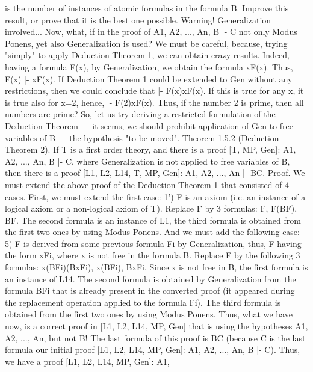is the number of instances of atomic formulas in the formula B. Improve this result, or prove that it is the
best one possible.
Warning! Generalization involved...
Now, what, if in the proof of A1, A2, ..., An, B |- C not only Modus Ponens, yet also Generalization is
used?
We must be careful, because, trying "simply" to apply Deduction Theorem 1, we can obtain crazy results.
Indeed, having a formula F(x), by Generalization, we obtain the formula \forall xF(x). Thus, F(x) |- \forall xF(x). If
Deduction Theorem 1 could be extended to Gen without any restrictions, then we could conclude that |-
F(x)\IMPLIES \forall xF(x). If this is true for any x, it is true also for x=2, hence, |- F(2)\IMPLIES \forall xF(x). Thus, if the number
2 is prime, then all numbers are prime?
So, let us try deriving a restricted formulation of the Deduction Theorem --- it seems, we should prohibit
application of Gen to free variables of B --- the hypothesis "to be moved".
Theorem 1.5.2 (Deduction Theorem 2). If T is a first order theory, and there is a proof [T, MP, Gen]: A1,
A2, ..., An, B |- C, where Generalization is not applied to free variables of B, then there is a proof [L1, L2,
L14, T, MP, Gen]: A1, A2, ..., An |- B\IMPLIES C.
Proof. We must extend the above proof of the Deduction Theorem 1 that consisted of 4 cases. First, we
must extend the first case:
1') F is an axiom (i.e. an instance of a logical axiom or a non-logical axiom of T). Replace F by 3
formulas: F, F\IMPLIES (B\IMPLIES F), B\IMPLIES F. The second formula is an instance of L1, the third formula is obtained
from the first two ones by using Modus Ponens.
And we must add the following case:
5) F is derived from some previous formula Fi by Generalization, thus, F having the form \forall xFi, where x
is not free in the formula B. Replace F by the following 3 formulas:
\forall x(B\IMPLIES Fi)\IMPLIES (B\IMPLIES \forall xFi),
\forall x(B\IMPLIES Fi),
B\IMPLIES \forall xFi.
Since x is not free in B, the first formula is an instance of L14. The second formula is obtained by
Generalization from the formula B\IMPLIES Fi that is already present in the converted proof (it appeared during
the replacement operation applied to the formula Fi). The third formula is obtained from the first two ones
by using Modus Ponens.
Thus, what we have now, is a correct proof in [L1, L2, L14, MP, Gen] that is using the hypotheses A1,
A2, ..., An, but not B! The last formula of this proof is B\IMPLIES C (because C is the last formula our initial
proof [L1, L2, L14, MP, Gen]: A1, A2, ..., An, B |- C). Thus, we have a proof [L1, L2, L14, MP, Gen]: A1,
